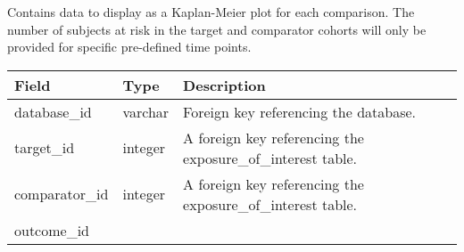 \documentclass[
]{article}
\begin{document}
Contains data to display as a Kaplan-Meier plot for each comparison. The
number of subjects at risk in the target and comparator cohorts will
only be provided for specific pre-defined time points.

\begin{longtable}[]{@{}lll@{}}
\toprule
\begin{minipage}[b]{0.23\columnwidth}\raggedright
Field\strut
\end{minipage} & \begin{minipage}[b]{0.18\columnwidth}\raggedright
Type\strut
\end{minipage} & \begin{minipage}[b]{0.50\columnwidth}\raggedright
Description\strut
\end{minipage}\tabularnewline
\midrule
\endhead
\begin{minipage}[t]{0.23\columnwidth}\raggedright
database\_id\strut
\end{minipage} & \begin{minipage}[t]{0.18\columnwidth}\raggedright
varchar\strut
\end{minipage} & \begin{minipage}[t]{0.50\columnwidth}\raggedright
Foreign key referencing the database.\strut
\end{minipage}\tabularnewline
\begin{minipage}[t]{0.23\columnwidth}\raggedright
target\_id\strut
\end{minipage} & \begin{minipage}[t]{0.18\columnwidth}\raggedright
integer\strut
\end{minipage} & \begin{minipage}[t]{0.50\columnwidth}\raggedright
A foreign key referencing the exposure\_of\_interest table.\strut
\end{minipage}\tabularnewline
\begin{minipage}[t]{0.23\columnwidth}\raggedright
comparator\_id\strut
\end{minipage} & \begin{minipage}[t]{0.18\columnwidth}\raggedright
integer\strut
\end{minipage} & \begin{minipage}[t]{0.50\columnwidth}\raggedright
A foreign key referencing the exposure\_of\_interest table.\strut
\end{minipage}\tabularnewline
\begin{minipage}[t]{0.23\columnwidth}\raggedright
outcome\_id\strut
\end{minipage} & \begin{minipage}[t]{0.18\columnwidth}\raggedright

\end{minipage}
\end{longtable}
\end{document}
